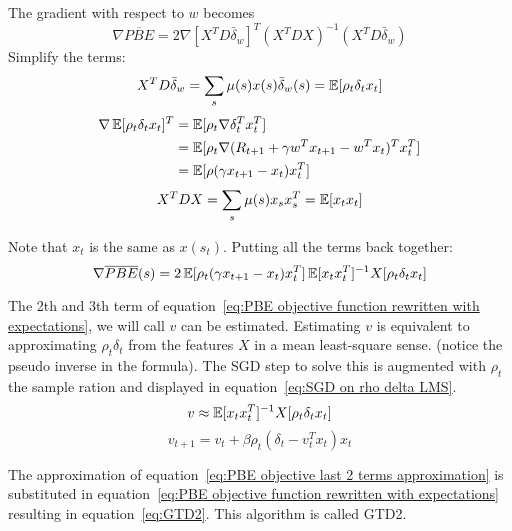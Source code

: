 The gradient with respect to $w$ becomes
\begin{equation}
\nabla\overline{PBE} = 2 \nabla [X^TD\bar{\delta}_w]^T (X^TDX)^{-1} (X^TD\bar{\delta}_w)
\end{equation}
Simplify the terms:
\begin{equation}
X^TD\bar{\delta}_w = \sum_s \mu(s)x(s)\bar{\delta}_w(s) = \operatorname{\mathbb{E}}[\rho_t\delta_tx_t]
\end{equation}
\begin{equation}
\begin{split}
\nabla \operatorname{\mathbb{E}}[\rho_t\delta_tx_t]^T & = \operatorname{\mathbb{E}}[\rho_t\nabla\delta_t^Tx_t^T] \\
& = \operatorname{\mathbb{E}}[\rho_t \nabla(R_{t+1} + \gamma w^Tx_{t+1} - w^Tx_t)^Tx_t^T] \\
& = \operatorname{\mathbb{E}}[\rho(\gamma x_{t+1} - x_t)x_t^T]
\end{split} 
\end{equation}
\begin{equation}
X^TDX = \sum_s \mu(s)x_sx_s^T = \operatorname{\mathbb{E}}[x_tx_t]
\end{equation}

Note that $x_t$ is the same as $x(s_t)$. Putting all the terms back together:
\begin{equation}
\nabla \overline{PBE}(s) = 2\operatorname{\mathbb{E}}[\rho_t(\gamma x_{t+1}-x_t)x^T_t]\operatorname{\mathbb{E}}[x_tx_t^T]^{-1}X[\rho_t\delta_tx_t]
\label{eq:PBE objective function rewritten with expectations}
\end{equation}
 
The 2th and 3th term of equation~\ref{eq:PBE objective function rewritten with expectations}, we will call $v$ can be estimated. Estimating $v$ is equivalent to approximating $\rho_t\delta_t$ from the features $X$ in a mean least-square sense. (notice the pseudo inverse in the formula). The SGD step to solve this is augmented with $\rho_t$ the sample ration and displayed in equation~\ref{eq:SGD on rho delta LMS}.
\begin{equation}
v\approx\operatorname{\mathbb{E}}[x_tx_t^T]^{-1}X[\rho_t\delta_tx_t]
\label{eq:PBE objective last 2 terms approximation}
\end{equation}
\begin{equation}
v_{t+1} = v_t + \beta \rho_t (\delta_t -v_t^Tx_t)x_t
\label{eq:SGD on rho delta LMS}
\end{equation}

The approximation of equation~\ref{eq:PBE objective last 2 terms approximation} is substituted in equation~\ref{eq:PBE objective function rewritten with expectations} resulting in equation~\ref{eq:GTD2}. This algorithm is called GTD2.

